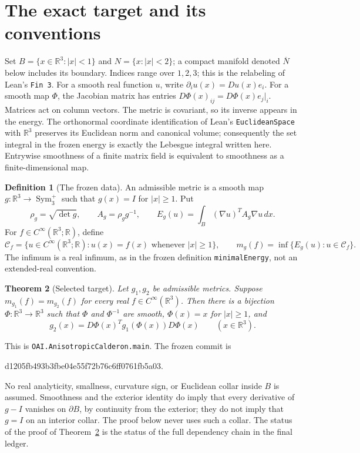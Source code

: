 \documentclass[11pt]{article}
\newtheorem{theorem}{Theorem}[section]
\theoremstyle{definition}
\newtheorem{definition}[theorem]{Definition}
\theoremstyle{remark}
\numberwithin{equation}{section}
\begin{document}
\clearpage
\tableofcontents
\newpage

\section{The exact target and its conventions}\label{expanded:target}

Set $B=\{x\in\mathbb R^3:|x|<1\}$ and $N=\{x:|x|<2\}$; a compact
manifold denoted $\overline N$ below includes its boundary. Indices range
over $1,2,3$; this is the relabeling of Lean's \texttt{Fin 3}. For a smooth
real function $u$, write $\partial_i u(x)=Du(x)e_i$. For a smooth map
$\Phi$, the Jacobian matrix has entries $D\Phi(x)_{ij}=D\Phi(x)e_j\vert_i$.
Matrices act on column vectors. The metric is covariant, so its inverse
appears in the energy. The orthonormal coordinate identification of Lean's
\texttt{EuclideanSpace} with $\mathbb R^3$ preserves its Euclidean norm
and canonical volume; consequently the set integral in the frozen energy
is exactly the Lebesgue integral written here. Entrywise smoothness of a
finite matrix field is equivalent to smoothness as a finite-dimensional map.

\begin{definition}[The frozen data]\label{expanded:definitions}
An admissible metric is a smooth map $g:\mathbb R^3\to
\operatorname{Sym}^+_3$ such that $g(x)=I$ for $|x|\geq1$. Put
\[
 \rho_g=\sqrt{\det g},\qquad A_g=\rho_g g^{-1},\qquad
 E_g(u)=\int_B (\nabla u)^T A_g\nabla u\,dx.
\]
For $f\in C^\infty(\mathbb R^3;\mathbb R)$, define
\[
 \mathcal C_f=\{u\in C^\infty(\mathbb R^3;\mathbb R):
                         u(x)=f(x)\text{ whenever }|x|\geq1\},
 \qquad m_g(f)=\inf\{E_g(u):u\in\mathcal C_f\}.
\]
The infimum is a real infimum, as in the frozen definition
\texttt{minimalEnergy}, not an extended-real convention.
\end{definition}

\begin{theorem}[Selected target]\label{expanded:main}
Let $g_1,g_2$ be admissible metrics. Suppose
$m_{g_1}(f)=m_{g_2}(f)$ for every real $f\in C^\infty(\mathbb R^3)$.
Then there is a bijection $\Phi:\mathbb R^3\to\mathbb R^3$ such that
$\Phi$ and $\Phi^{-1}$ are smooth, $\Phi(x)=x$ for $|x|\geq1$, and
\begin{equation}\label{expanded:pullback}
 g_2(x)=D\Phi(x)^Tg_1(\Phi(x))D\Phi(x)\qquad(x\in\mathbb R^3).
\end{equation}
\end{theorem}

This is \texttt{OAI.AnisotropicCalderon.main}. The frozen commit is
\begin{center}\ttfamily d1205fb493b3fbe04e55f72b76c6ff0761fb5a03.\end{center}
No real analyticity,
smallness, curvature sign, or Euclidean collar inside $B$ is assumed.
Smoothness and the exterior identity do imply that every derivative of
$g-I$ vanishes on $\partial B$, by continuity from the exterior; they
do not imply that $g=I$ on an interior collar. The proof below never uses
such a collar. The status of the proof of Theorem~\ref{expanded:main}
is the status of the full dependency chain in the final ledger.
\end{document}
